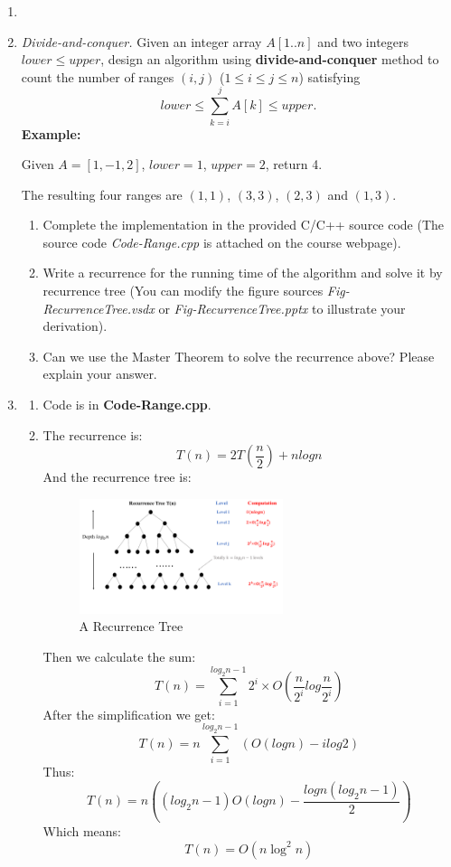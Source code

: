 \documentclass[12pt,a4paper]{article}
\makeatletter
\newtheorem*{solution}{Solution}
\theoremstyle{definition}
\renewenvironment{solution}[1][Solution] {\par\pushQED{\qed}\normalfont\topsep6\p@\@plus6\p@\relax\trivlist\item[\hskip\labelsep\bfseries#1\@addpunct{.}]\ignorespaces}{\popQED\endtrivlist\@endpefalse} \makeatother
\makeatother
\begin{document}
\begin{enumerate}
\begin{solution}
\begin{enumerate}
\end{enumerate}
\end{solution}
\item
\textit{Divide-and-conquer.} Given an integer array $A[1..n]$ and two integers $lower \le upper$, design an algorithm using \textbf{divide-and-conquer} method to count the number of ranges $(i,j)$ ($1 \leq i \leq j \leq n$) satisfying
$$
    lower \leq \sum_{k=i}^{j}{A[k]} \leq upper.
$$
\textbf{Example:}

Given $A = [1,-1,2]$, $lower = 1$, $upper = 2$, return 4.

The resulting four ranges are $(1,1)$, $(3,3)$, $(2,3)$ and $(1,3)$.

\begin{enumerate}
\item
Complete the implementation in the provided C/C++ source code {\color{blue}(The source code \emph{Code-Range.cpp} is attached on the course webpage)}.
\item
Write a recurrence for the running time of the algorithm and solve it by recurrence tree {\color{blue}(You can modify the figure sources \emph{Fig-RecurrenceTree.vsdx} or \emph{Fig-RecurrenceTree.pptx} to illustrate your derivation)}.
\item
Can we use the Master Theorem to solve the recurrence above? Please explain your answer.
\end{enumerate}

\begin{solution}
\begin{enumerate}
\item
Code is in \textbf{Code-Range.cpp}.
\item
The recurrence is:
$$
T(n) = 2T(\frac{n}{2}) + nlogn
$$
And the recurrence tree is:
\begin{figure}[htbp]
    \centering
    \includegraphics[width=0.6\textwidth]{Fig-RecurrenceTree.pdf}
    \caption{A Recurrence Tree}\label{Fig-RecurrenceTree}
\end{figure}


Then we calculate the sum:
$$
\displaystyle T(n) = \sum_{i=1}^{log_2n-1}2^i\times O(\frac{n}{2^i}log\frac{n}{2^i})
$$
After the simplification we get:
$$
\displaystyle T(n) = n\sum_{i=1}^{log_2n-1}(O(logn)-ilog2)
$$
Thus:
$$
\displaystyle T(n)=n\left((log_2n-1)O(logn) - \frac{logn(log_2n-1)}{2}\right)
$$
Which means:
$$
T(n) = O(n\log^2 n)
$$


\end{enumerate}
\end{solution}
\end{enumerate}
\end{document}
